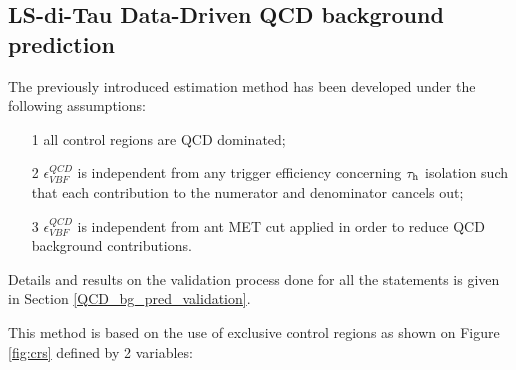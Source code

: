 \clearpage

\subsection {LS-di-Tau Data-Driven QCD background prediction} \label{sec:bgestimation}

The previously introduced estimation method has been developed under the following assumptions:
\begin{itemize}
	\item[1] all control regions are QCD dominated;
	\item[2] $\epsilon^{QCD}_{VBF}$ is independent from any trigger efficiency concerning $\tau_{\text{h}}$ isolation such that each contribution to the numerator and denominator cancels out;
	\item[3] $\epsilon^{QCD}_{VBF}$ is independent from ant MET cut applied in order to reduce QCD background contributions. 
\end{itemize}

Details and results on the validation process done for all the statements is given in Section \ref{QCD_bg_pred_validation}.

This method is based on the use of exclusive control regions as shown on Figure \ref{fig:crs} defined by 2 variables:

